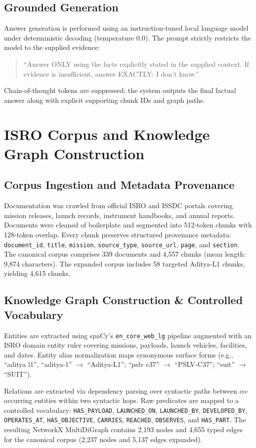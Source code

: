 \documentclass[conference]{IEEEtran}
\begin{document}
\subsection{Grounded Generation}
Answer generation is performed using an instruction-tuned local language model under deterministic decoding (temperature 0.0). The prompt strictly restricts the model to the supplied evidence:
\begin{quote}
``Answer ONLY using the facts explicitly stated in the supplied context. If evidence is insufficient, answer EXACTLY: I don't know.''
\end{quote}
Chain-of-thought tokens are suppressed; the system outputs the final factual answer along with explicit supporting chunk IDs and graph paths.

\section{ISRO Corpus and Knowledge Graph Construction}
\label{sec:corpus_kg}

\subsection{Corpus Ingestion and Metadata Provenance}
Documentation was crawled from official ISRO and ISSDC portals covering mission releases, launch records, instrument handbooks, and annual reports. Documents were cleaned of boilerplate and segmented into 512-token chunks with 128-token overlap. Every chunk preserves structured provenance metadata: \texttt{document\_id}, \texttt{title}, \texttt{mission}, \texttt{source\_type}, \texttt{source\_url}, \texttt{page}, and \texttt{section}. The canonical corpus comprises 339 documents and 4,557 chunks (mean length: 9,874 characters). The expanded corpus includes 58 targeted Aditya-L1 chunks, yielding 4,615 chunks.

\subsection{Knowledge Graph Construction & Controlled Vocabulary}
Entities are extracted using spaCy's \texttt{en\_core\_web\_lg} pipeline augmented with an ISRO domain entity ruler covering missions, payloads, launch vehicles, facilities, and dates. Entity alias normalization maps synonymous surface forms (e.g., ``aditya l1'', ``aditya-1'' $\to$ ``Aditya-L1''; ``pslv c37'' $\to$ ``PSLV-C37''; ``suit'' $\to$ ``SUIT'').

Relations are extracted via dependency parsing over syntactic paths between co-occurring entities within two syntactic hops. Raw predicates are mapped to a controlled vocabulary: \texttt{HAS\_PAYLOAD}, \texttt{LAUNCHED\_ON}, \texttt{LAUNCHED\_BY}, \texttt{DEVELOPED\_BY}, \texttt{OPERATES\_AT}, \texttt{HAS\_OBJECTIVE}, \texttt{CARRIES}, \texttt{REACHED}, \texttt{OBSERVES}, and \texttt{HAS\_PART}. The resulting NetworkX MultiDiGraph contains 2,193 nodes and 4,655 typed edges for the canonical corpus (2,237 nodes and 5,137 edges expanded).
\end{document}
